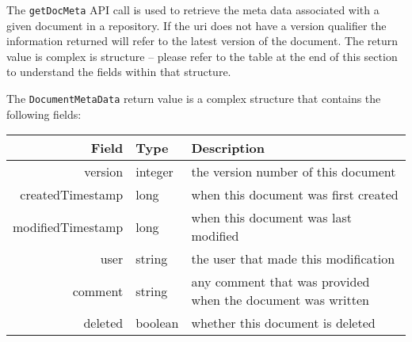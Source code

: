 The \verb+getDocMeta+ API call is used to retrieve the meta data associated
with a given document in a repository. If the uri does not have a version
qualifier the information returned will refer to the latest version of the
document. The return value is complex is structure -- please refer to the
table at the end of this section to understand the fields within that
structure.

The \verb+DocumentMetaData+ return value is a complex structure that contains
the following fields:

\begin{table}[H]
  \small
\begin{center}
\begin{tabular}{rl p{8cm}}
  Field & Type & Description \\
  \hline
  version & integer & the version number of this document \\
  createdTimestamp & long & when this document was first created \\
  modifiedTimestamp & long & when this document was last modified \\
  user & string & the user that made this modification \\
  comment & string & any comment that was provided when the document was written \\
  deleted & boolean & whether this document is deleted \\
\end{tabular}
\end{center}
\end{table}

